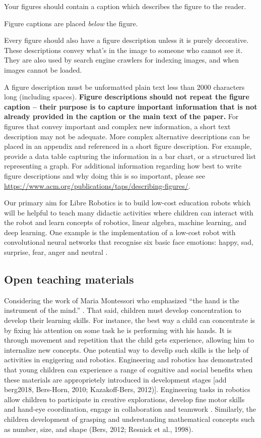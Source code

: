 \documentclass[sigconf]{acmart}
\begin{document}
Your figures should contain a caption which describes the figure to
the reader.

Figure captions are placed {\itshape below} the figure.

Every figure should also have a figure description unless it is purely
decorative. These descriptions convey what’s in the image to someone
who cannot see it. They are also used by search engine crawlers for
indexing images, and when images cannot be loaded.

A figure description must be unformatted plain text less than 2000
characters long (including spaces).  {\bfseries Figure descriptions
  should not repeat the figure caption – their purpose is to capture
  important information that is not already provided in the caption or
  the main text of the paper.} For figures that convey important and
complex new information, a short text description may not be
adequate. More complex alternative descriptions can be placed in an
appendix and referenced in a short figure description. For example,
provide a data table capturing the information in a bar chart, or a
structured list representing a graph.  For additional information
regarding how best to write figure descriptions and why doing this is
so important, please see
\url{https://www.acm.org/publications/taps/describing-figures/}.

Our primary aim for Libre Robotics is to build low-cost education robots 
which will be helpful to teach many didactic activities where children 
can interact with the robot and learn concepts of robotics, linear algebra, 
machine learning, and deep learning.
One example is the implementation of a low-cost robot with 
convolutional neural networks that recognise six basic face emotions: 
happy, sad, surprise, fear, anger and neutral \cite{ho2016, Ruiz-Garcia2016}. 

\subsection{Open teaching materials}
Considering the work of Maria Montessori who emphasized “the hand is the instrument of the mind.” \cite{montessori2013absorbent}. 
That said, children must develop concentration to develop their learning skills. 
For instance, the best way a child can concentrate is by fixing his attention on some task he is performing with his hands. 
It is through movement and repetition that the child gets experience, allowing him to internalize new concepts. 
One potential way to develip such skills is the help of activities in engigering and robotics. 
Engineering and robotics has demonstrated that young children can experience a range of cognitive and social benefits when these materials are approprietely introduced in development stages [add berg2018, Bers-Horn, 2010; Kazakoff-Bers, 2012)].
Engineering tasks in robotics allow children to participate in creative explorations, develop fine motor skills and hand-eye coordination, engage in collaboration and teamwork \cite{elkin2014}.
Similarly, the children development of grasping and understanding mathematical concepts such as number, size, and shape (Bers, 2012; Resnick et al., 1998).
\end{document}
